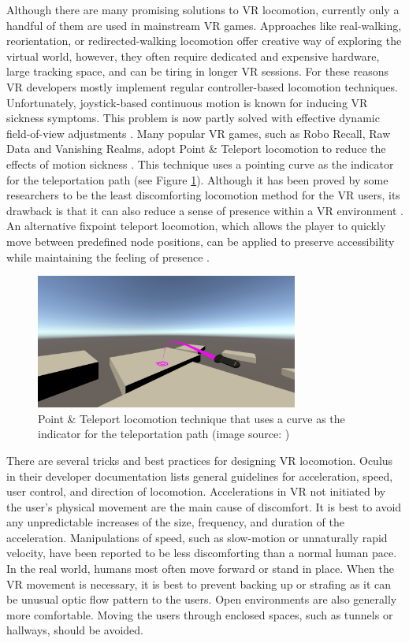 Although there are many promising solutions to VR locomotion, currently only a handful of them are used in mainstream VR games. Approaches like real-walking, reorientation, or redirected-walking locomotion offer creative way of exploring the virtual world, however, they often require dedicated and expensive hardware, large tracking space, and can be tiring in longer VR sessions. For these reasons VR developers mostly implement regular controller-based locomotion techniques. Unfortunately, joystick-based continuous motion is known for inducing VR sickness symptoms. This problem is now partly solved with effective dynamic field-of-view adjustments \cite{DYNAMICFOD}. Many popular VR games, such as Robo Recall, Raw Data and Vanishing Realms, adopt Point \& Teleport locomotion to reduce the effects of motion sickness \cite{TELEPORTATIONGAMES}. This technique uses a pointing curve as the indicator for the teleportation path (see Figure \ref{fig:TELEPORTATIONCURVEIMAGE}). Although it has been proved by some researchers to be the least discomforting locomotion method for the VR users, its drawback is that it can also reduce a sense of presence within a VR environment \cite{TELEPORTATIONEFFECTS}. An alternative fixpoint teleport locomotion, which allows the player to quickly move between predefined node positions, can be applied to preserve accessibility while maintaining the feeling of presence \cite{NODEBASEDTELEPORTATION}.

\begin{figure}[th]
\centering
\includegraphics[width=0.77\textwidth]{img/teleportation_curve.png}
\caption{Point \& Teleport locomotion technique that uses a curve as the indicator for the teleportation path (image source: \cite{TELEPORTATIONCURVE})}
\label{fig:TELEPORTATIONCURVEIMAGE}
\end{figure}

There are several tricks and best practices for designing VR locomotion. Oculus in their developer documentation \cite{OCULUSDOC} lists general guidelines for acceleration, speed, user control, and direction of locomotion. Accelerations in VR not initiated by the user's physical movement are the main cause of discomfort. It is best to avoid any unpredictable increases of the size, frequency, and duration of the acceleration. Manipulations of speed, such as slow-motion or unnaturally rapid velocity, have been reported to be less discomforting than a normal human pace. In the real world, humans most often move forward or stand in place. When the VR movement is necessary, it is best to prevent backing up or strafing as it can be unusual optic flow pattern to the users. Open environments are also generally more comfortable. Moving the users through enclosed spaces, such as tunnels or hallways, should be avoided.

